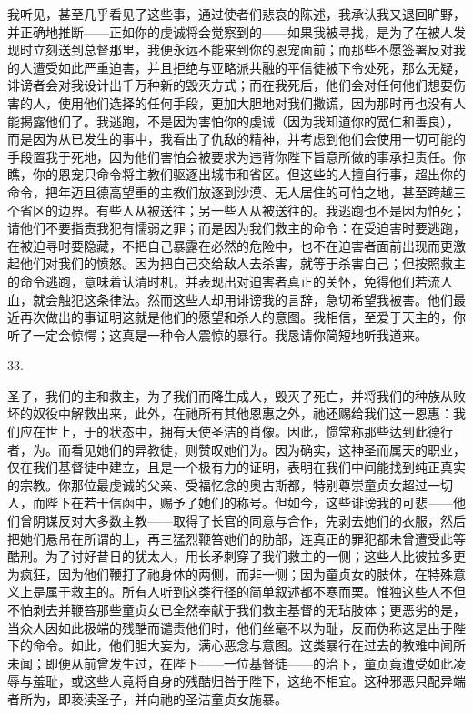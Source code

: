 我听见，甚至几乎看见了这些事，通过使者们悲哀的陈述，我承认我又退回旷野，并正确地推断——正如你的虔诚将会觉察到的——如果我被寻找，是为了在被人发现时立刻送到总督那里，我便永远不能来到你的恩宠面前；而那些不愿签署反对我的人遭受如此严重迫害，并且拒绝与亚略派共融的平信徒被下令处死，那么无疑，诽谤者会对我设计出千万种新的毁灭方式；而在我死后，他们会对任何他们想要伤害的人，使用他们选择的任何手段，更加大胆地对我们撒谎，因为那时再也没有人能揭露他们了。我逃跑，不是因为害怕你的虔诚（因为我知道你的宽仁和善良），而是因为从已发生的事中，我看出了仇敌的精神，并考虑到他们会使用一切可能的手段置我于死地，因为他们害怕会被要求为违背你陛下旨意所做的事承担责任。你瞧，你的恩宠只命令将主教们驱逐出城市和省区。但这些的人擅自行事，超出你的命令，把年迈且德高望重的主教们放逐到沙漠、无人居住的可怕之地，甚至跨越三个省区的边界。有些人从被送往；另一些人从被送往的。我逃跑也不是因为怕死；请他们不要指责我犯有懦弱之罪；而是因为我们救主的命令：在受迫害时要逃跑，在被迫寻时要隐藏，不把自己暴露在必然的危险中，也不在迫害者面前出现而更激起他们对我们的愤怒。因为把自己交给敌人去杀害，就等于杀害自己；但按照救主的命令逃跑，意味着认清时机，并表现出对迫害者真正的关怀，免得他们若流人血，就会触犯这条律法。然而这些人却用诽谤我的言辞，急切希望我被害。他们最近再次做出的事证明这就是他们的愿望和杀人的意图。我相信，至爱于天主的，你听了一定会惊愕；这真是一种令人震惊的暴行。我恳请你简短地听我道来。\par

33. \par

圣子，我们的主和救主，为了我们而降生成人，毁灭了死亡，并将我们的种族从败坏的奴役中解救出来，此外，在祂所有其他恩惠之外，祂还赐给我们这一恩惠：我们应在世上，于的状态中，拥有天使圣洁的肖像。因此，惯常称那些达到此德行者，为。而看见她们的异教徒，则赞叹她们为。因为确实，这神圣而属天的职业，仅在我们基督徒中建立，且是一个极有力的证明，表明在我们中间能找到纯正真实的宗教。你那位最虔诚的父亲、受福忆念的奥古斯都，特别尊崇童贞女超过一切人，而陛下在若干信函中，赐予了她们的称号。但如今，这些诽谤我的可悲——他们曾阴谋反对大多数主教——取得了长官的同意与合作，先剥去她们的衣服，然后把她们悬吊在所谓的上，再三猛烈鞭笞她们的肋部，连真正的罪犯都未曾遭受此等酷刑。为了讨好昔日的犹太人，用长矛刺穿了我们救主的一侧；这些人比彼拉多更为疯狂，因为他们鞭打了祂身体的两侧，而非一侧；因为童贞女的肢体，在特殊意义上是属于救主的。所有人听到这类行径的简单叙述都不寒而栗。惟独这些人不但不怕剥去并鞭笞那些童贞女已全然奉献于我们救主基督的无玷肢体；更恶劣的是，当众人因如此极端的残酷而谴责他们时，他们丝毫不以为耻，反而伪称这是出于陛下的命令。如此，他们胆大妄为，满心恶念与意图。这类暴行在过去的教难中闻所未闻；即便从前曾发生过，在陛下——一位基督徒——的治下，童贞竟遭受如此凌辱与羞耻，或这些人竟将自身的残酷归咎于陛下，这绝不相宜。这种邪恶只配异端者所为，即亵渎圣子，并向祂的圣洁童贞女施暴。\par

